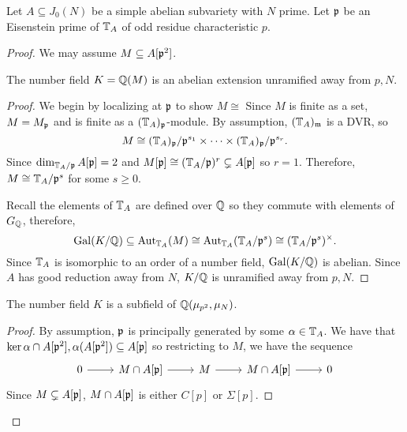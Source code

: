 \documentclass[thesis.tex]{subfiles}
\begin{document}
\begin{proposition}{{\cite[Prop. 4.5]{klosin-papikian:ribet}}}%
    \label{prop:eisenstein_cyclic}
    Let $A\subseteq J_0(N)$ be a simple abelian subvariety with $N$ prime. Let
    $\mathfrak{p}$ be an Eisenstein prime of $\mathbb{T}_A$ of odd residue characteristic $p$. 
\end{proposition}
\begin{proof}
    We may assume $M\subseteq A[\mathfrak{p}^2]$.

    \begin{lemma}
        The number field $K=\mathbb{Q}(M)$ is an abelian extension unramified away from $p, N$.
    \end{lemma}
    \begin{proof}
        We begin by localizing at $\mathfrak{p}$ to show $M\cong $ Since $M$ is finite as a set, $M=M_{\mathfrak{p}}$ and is
        finite as a $(\mathbb{T}_A)_{\mathfrak{p}}$-module. By assumption, $(\mathbb{T}_A)_{\mathfrak{m}}$ is a DVR\@, so
        \[
            M\cong (\mathbb{T}_A)_{\mathfrak{p}} / \mathfrak{p}^{s_1} \times\cdots \times (\mathbb{T}_A)_{\mathfrak{p}} /
            \mathfrak{p}^{s_r}.
        \]
        Since $\dim_{\mathbb{T}_A/\mathfrak{p}} A[\mathfrak{p}]=2$ and $M[\mathfrak{p}]\cong (\mathbb{T}_A / \mathfrak{p})^r
        \subsetneq A[\mathfrak{p}]$ so $r=1$. Therefore, $M\cong \mathbb{T}_A/\mathfrak{p}^s$ for some
        $s\geq 0$.

        Recall the elements of $\mathbb{T}_A$ are defined over $\mathbb{Q}$ so they commute
        with elements of $G_{\mathbb{Q}}$, therefore,
        \[
            \operatorname{Gal}(K/\mathbb{Q})\subseteq \operatorname{Aut}_{\mathbb{T}_A} (M) \cong \operatorname{Aut}_{\mathbb{T}_A}
            (\mathbb{T}_A/\mathfrak{p}^s) \cong (\mathbb{T}_A/\mathfrak{p}^s)^\times.
        \]
        Since $\mathbb{T}_A$ is isomorphic to an order of a number field,
        $\operatorname{Gal}(K/\mathbb{Q})$ is abelian. Since $A$ has good reduction away from $N$,
        $K/\mathbb{Q}$ is unramified away from $p, N$.
    \end{proof}

    \begin{lemma}
        The number field $K$ is a subfield of $\mathbb{Q}(\mu_{p^2}, \mu_N)$.
    \end{lemma}
    \begin{proof}
        By assumption, $\mathfrak{p}$ is principally generated by some $\alpha\in \mathbb{T}_A$. We
        have that $\ker \alpha \cap A[\mathfrak{p}^2], \alpha(A[\mathfrak{p}^2]) \subseteq A[\mathfrak{p}]$ so
        restricting to $M$, we have the sequence
        \begin{equation}
            \label{eq:M_Ap}
            \begin{tikzcd}
                0 \arrow[r] &
                M\cap A[\p] \arrow[r] &
                M \arrow[r] &
                M\cap A[\p] \arrow[r] &
                0
            \end{tikzcd} 
        \end{equation}
        Since $M\subsetneq A[\mathfrak{p}]$, $M\cap A[\mathfrak{p}]$ is either $C[p]$ or
        $\Sigma[p]$. 


\end{proof}
\end{proof}
\end{document}

